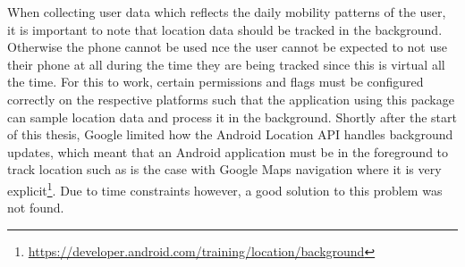 When collecting user data which reflects the daily mobility patterns of the user, it is important to note that location data should be tracked in the background. Otherwise the phone cannot be used nce the user cannot be expected to not use their phone at all during the time they are being tracked since this is virtual all the time. For this to work, certain permissions and flags must be configured correctly on the respective platforms such that the application using this package can sample location data and process it in the background. Shortly after the start of this thesis, Google limited how the Android Location API handles background updates, which meant that an Android application must be in the foreground to track location such as is the case with Google Maps navigation where it is very explicit\footnote{\url{https://developer.android.com/training/location/background}}. Due to time constraints however, a good solution to this problem was not found.